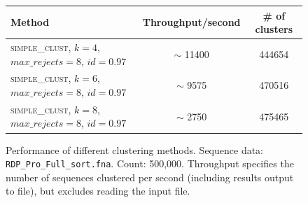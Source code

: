 \begin{figure}[H]
  \begin{tabular}{ p{18em} | c | c }
  Method  & Throughput/second   & \# of clusters \\
  \hline \hline
  \textsc{simple\_clust}, $k=4$, $max\_rejects=8$, $id=0.97$  & $\sim$ 11400  & 444654  \\
  \hline
  \textsc{simple\_clust}, $k=6$, $max\_rejects=8$, $id=0.97$  & $\sim$ 9575   & 470516  \\
  \hline
  \textsc{simple\_clust}, $k=8$, $max\_rejects=8$, $id=0.97$  & $\sim$ 2750   & 475465  \\
\end{tabular}
\caption{Performance of different clustering methods. Sequence data:
         \texttt{RDP\_Pro\_Full\_sort.fna}. Count: 500,000. Throughput
         specifies the number of sequences clustered per second (including
         results output to file), but excludes reading the input file.}
\end{figure}
